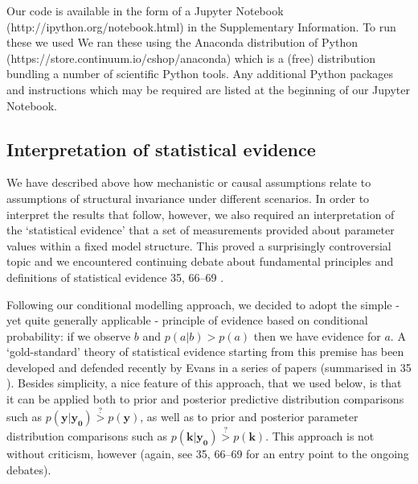 \documentclass[10pt,letterpaper]{article}
\providecommand{\DIFaddtex}[1]{{\protect\color{blue} \sf #1}} %
\providecommand{\DIFdeltex}[1]{{\protect\color{red} \scriptsize #1}} %
\providecommand{\DIFaddbegin}{} %
\providecommand{\DIFaddend}{} %
\providecommand{\DIFdelbegin}{} %
\providecommand{\DIFdelend}{} %
\providecommand{\DIFadd}[1]{\texorpdfstring{\DIFaddtex{#1}}{#1}} %
\providecommand{\DIFdel}[1]{\texorpdfstring{\DIFdeltex{#1}}{}} %
\begin{document}
Our code is available in the form of a Jupyter Notebook
(http://ipython.org/notebook.html) in the Supplementary Information. \DIFdelbegin \DIFdel{To
run these we used }\DIFdelend \DIFaddbegin \DIFadd{We
ran these using }\DIFaddend the Anaconda distribution of Python
(https://store.continuum.io/cshop/anaconda) which is a (free)
distribution bundling a number of scientific Python tools. Any
additional Python packages and instructions which may be required are
listed at the beginning of our Jupyter Notebook.

\DIFdelbegin \subsection{\DIFdel{Interpretation of statistical
evidence}}%
\addtocounter{subsection}{-1}%

\DIFdel{We have described above how mechanistic or causal assumptions relate to
assumptions of structural invariance under different scenarios. In order
to interpret the results that follow, however, we also required an
interpretation of the `statistical evidence' that a set of measurements
provided about parameter values within a fixed model structure. This
proved a surprisingly controversial topic and we encountered continuing
debate about fundamental principles and definitions of statistical
evidence }%
\DIFdel{35, 66--69}%
\DIFdel{.
}%

\DIFdel{Following our conditional modelling approach, we decided to adopt the
simple - yet quite generally applicable - principle of evidence based on
conditional probability: if we observe \(b\) and \(p(a|b) > p(a)\) then
we have evidence for \(a\). A `gold-standard' theory of statistical
evidence starting from this premise has been developed and defended
recently by Evans in a series of papers (summarised in }%
\DIFdel{35}%
\DIFdel{).
Besides simplicity, a nice feature of this approach, that we used below,
is that it can be applied both to prior and posterior predictive
distribution comparisons such as
\(p(\mathbf{y}|\mathbf{y_0}) \overset{?}{>} p(\mathbf{y})\), as well as
to prior and posterior parameter distribution comparisons such as
\(p(\mathbf{k}|\mathbf{y_0}) \overset{?}{>} p(\mathbf{k})\). This
approach is not without criticism, however (again, see }%
\DIFdel{35, 66--69}%
\DIFdel{for an entry point to the ongoing debates).
}%
\end{document}

